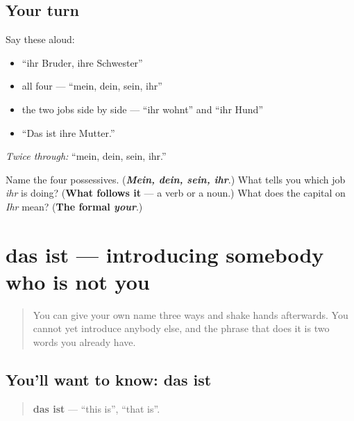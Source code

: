 \subsection*{Your turn}
Say these aloud:

\begin{itemize}
\raggedright
  \item \textquotedblleft{}ihr Bruder, ihre Schwester\textquotedblright{}
  \item all four — \textquotedblleft{}mein, dein, sein, ihr\textquotedblright{}
  \item the two jobs side by side — \textquotedblleft{}ihr wohnt\textquotedblright{} and \textquotedblleft{}ihr Hund\textquotedblright{}
  \item \textquotedblleft{}Das ist ihre Mutter.\textquotedblright{}
\end{itemize}

\emph{Twice through:} \textquotedblleft{}mein, dein, sein, ihr.\textquotedblright{}

\begin{tcolorbox}[breakable,colback=teal!4,colframe=teal!35!black,title={Before you move on}]
Name the four possessives. (\emph{\textbf{Mein, dein, sein, ihr}}.) What tells you which job \emph{ihr} is doing? (\textbf{What follows it} — a verb or a noun.) What does the capital on \emph{Ihr} mean? (\textbf{The formal \emph{your}}.)
\end{tcolorbox}
\section[Das ist mein Bruder]{das ist — introducing somebody who is not you}

\label{lesson:GE-C36-das-ist}



\begin{quote}
You can give your own name three ways and shake hands afterwards. You cannot yet introduce anybody else, and the phrase that does it is two words you already have.
\end{quote}

\subsection*{You'll want to know: das ist}
\begin{quote}
\textbf{das ist} — \textquotedblleft{}this is\textquotedblright{}, \textquotedblleft{}that is\textquotedblright{}.
\end{quote}

